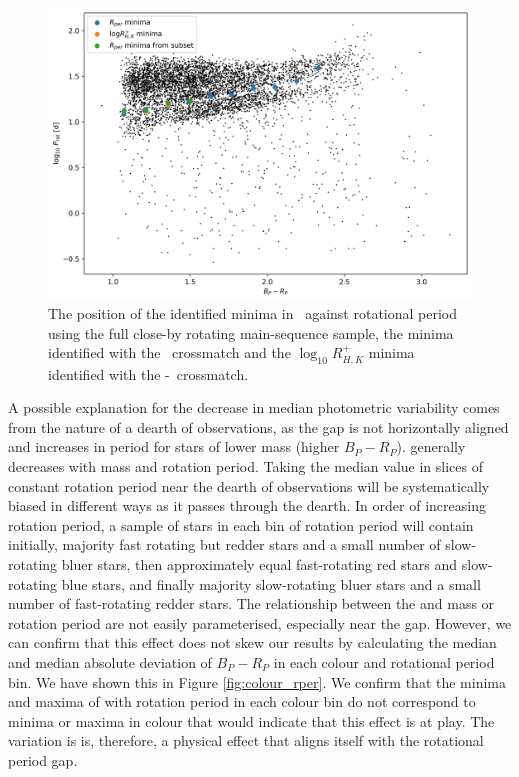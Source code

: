 \begin{figure}
\centering
  \includegraphics[width=\textwidth]{Figures/rot_gap_figures/rot_dist_minima_shown.png}
  \caption[The position of the identified minima in \rper{} \ against rotational period using the full close-by rotating main-sequence \kepler{} sample, the \rper{} minima identified with the \kepler-\lamost\ crossmatch and the $\log_{10} R^{+}_{H,K}$ minima identified with the \kepler{} \lamost\ crossmatch.]{
  The position of the identified minima in \rper{} \ against rotational period using the full close-by rotating main-sequence \kepler{} sample, the \rper{} minima identified with the \lamost\ crossmatch and the $\log_{10} R^{+}_{H,K}$ minima identified with the \kepler-\lamost\ crossmatch.}
  \label{fig:indicating_minima}
\end{figure}

A possible explanation for the decrease in median photometric variability comes from the nature of a dearth of observations, as the gap is not horizontally aligned and increases in period for stars of lower mass (higher $B_P-R_P$).
\rper{} generally decreases with mass and rotation period.
Taking the median value in slices of constant rotation period near the dearth of observations will be systematically biased in different ways as it passes through the dearth.
In order of increasing rotation period, a sample of stars in each bin of rotation period will contain initially, majority fast rotating but redder stars and a small number of slow-rotating bluer stars, then approximately equal fast-rotating red stars and slow-rotating blue stars, and finally majority slow-rotating bluer stars and a small number of fast-rotating redder stars.
The relationship between the \rper{} and mass or rotation period are not easily parameterised, especially near the gap.
However, we can confirm that this effect does not skew our results by calculating the median and median absolute deviation of $B_P-R_P$ in each colour and rotational period bin.
We have shown this in Figure \ref{fig:colour_rper}.
We confirm that the minima and maxima of \rper{} with rotation period in each colour bin do not correspond to minima or maxima in colour that would indicate that this effect is at play.
The variation is \rper{} is, therefore, a physical effect that aligns itself with the rotational period gap.

